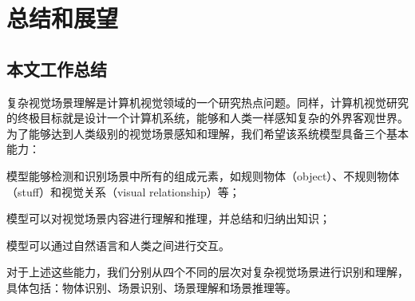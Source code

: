\chapter{总结和展望}

\section{本文工作总结}

复杂视觉场景理解是计算机视觉领域的一个研究热点问题。同样，计算机视觉研究的终极目标就是设计一个计算机系统，能够和人类一样感知复杂的外界客观世界。为了能够达到人类级别的视觉场景感知和理解，我们希望该系统模型具备三个基本能力：
\begin{asparaenum}
\item 模型能够检测和识别场景中所有的组成元素，如规则物体（object）、不规则物体（stuff）和视觉关系（visual relationship）等；

\item 模型可以对视觉场景内容进行理解和推理，并总结和归纳出知识；

\item 模型可以通过自然语言和人类之间进行交互。
\end{asparaenum}

对于上述这些能力，我们分别从四个不同的层次对复杂视觉场景进行识别和理解，具体包括：物体识别、场景识别、场景理解和场景推理等。

